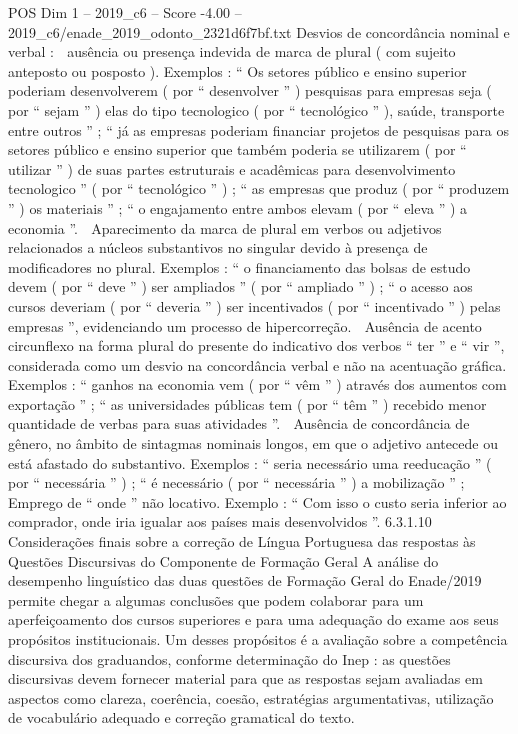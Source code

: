 \begin{textsample}{POS Dim 1 – 2019\_c6 – Score -4.00 – 2019\_c6/enade\_2019\_odonto\_2321d6f7bf.txt}
Desvios de concordância nominal e verbal :  ausência ou presença indevida de marca de plural ( com sujeito anteposto ou posposto ).
Exemplos : “ Os setores público e ensino superior poderiam desenvolverem ( por “ desenvolver ” ) pesquisas para empresas seja ( por “ sejam ” ) elas do tipo tecnologico ( por “ tecnológico ” ), saúde, transporte entre outros ” ; “ já as empresas poderiam financiar projetos de pesquisas para os setores público e ensino superior que também poderia se utilizarem ( por “ utilizar ” ) de suas partes estruturais e acadêmicas para desenvolvimento tecnologico ” ( por “ tecnológico ” ) ; “ as empresas que produz ( por “ produzem ” ) os materiais ” ; “ o engajamento entre ambos elevam ( por “ eleva ” ) a economia ”.  Aparecimento da marca de plural em verbos ou adjetivos relacionados a núcleos substantivos no singular devido à presença de modificadores no plural.
Exemplos : “ o financiamento das bolsas de estudo devem ( por “ deve ” ) ser ampliados ” ( por “ ampliado ” ) ; “ o acesso aos cursos deveriam ( por “ deveria ” ) ser incentivados ( por “ incentivado ” ) pelas empresas ”, evidenciando um processo de hipercorreção.  Ausência de acento circunflexo na forma plural do presente do indicativo dos verbos “ ter ” e “ vir ”, considerada como um desvio na concordância verbal e não na acentuação gráfica.
Exemplos : “ ganhos na economia vem ( por “ vêm ” ) através dos aumentos com exportação ” ; “ as universidades públicas tem ( por “ têm ” ) recebido menor quantidade de verbas para suas atividades ”.  Ausência de concordância de gênero, no âmbito de sintagmas nominais longos, em que o adjetivo antecede ou está afastado do substantivo.
Exemplos : “ seria necessário uma reeducação ” ( por “ necessária ” ) ; “ é necessário ( por “ necessária ” ) a mobilização ” ;  Emprego de “ onde ” não locativo.
Exemplo : “ Com isso o custo seria inferior ao comprador, onde iria igualar aos países mais desenvolvidos ”. 6.3.1.10 Considerações finais sobre a correção de Língua Portuguesa das respostas às Questões Discursivas do Componente de Formação Geral A análise do desempenho linguístico das duas questões de Formação Geral do Enade/2019 permite chegar a algumas conclusões que podem colaborar para um aperfeiçoamento dos cursos superiores e para uma adequação do exame aos seus propósitos institucionais.
Um desses propósitos é a avaliação sobre a competência discursiva dos graduandos, conforme determinação do Inep : as questões discursivas devem fornecer material para que as respostas sejam avaliadas em aspectos como clareza, coerência, coesão, estratégias argumentativas, utilização de vocabulário adequado e correção gramatical do texto.

\end{textsample}
